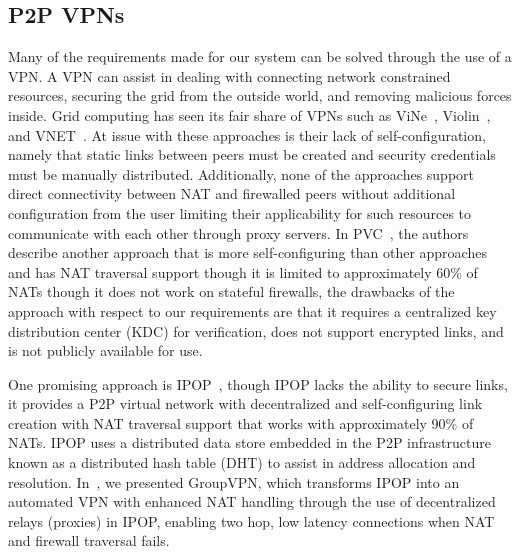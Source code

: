 \documentclass{sig-alternate}
\begin{document}
\subsection{P2P VPNs}
Many of the requirements made for our system can be solved through the use of a
VPN.  A VPN can assist in dealing with connecting network constrained resources,
securing the grid from the outside world, and removing malicious forces inside.
Grid computing has seen its fair share of VPNs such as ViNe~\cite{vine},
Violin~\cite{violin}, and VNET~\cite{vnet}.  At issue with these approaches is
their lack of self-configuration, namely that static links between peers must
be created and security credentials must be manually distributed.
Additionally, none of the approaches support direct connectivity between NAT
and firewalled peers without additional configuration from the user limiting
their applicability for such resources to communicate with each other through
proxy servers.  In PVC~\cite{pvc}, the authors describe another
approach that is more self-configuring than other approaches and has NAT
traversal support though it is limited to approximately 60\% of NATs though it
does not work on stateful firewalls, the drawbacks of the approach with respect
to our requirements are that it requires a centralized key distribution center
(KDC) for verification, does not support encrypted links, and is not publicly
available for use.

One promising approach is IPOP~\cite{ipop}, though IPOP lacks the ability to
secure links, it provides a P2P virtual network with decentralized and
self-configuring link creation with NAT traversal support that works with
approximately 90\% of NATs.  IPOP uses a distributed data store embedded in
the P2P infrastructure known as a distributed hash table (DHT) to assist in
address allocation and resolution.  In~\cite{groupvpn}, we presented GroupVPN,
which transforms IPOP into an automated VPN with enhanced NAT handling through
the use of decentralized relays (proxies) in IPOP, enabling two hop, low latency
connections when NAT and firewall traversal fails.
\end{document}
